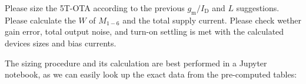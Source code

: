 \documentclass[
  a4paper,
  DIV=11,
  numbers=noendperiod]{scrartcl}
\begin{document}
\begin{tcolorbox}[enhanced jigsaw, breakable, title=\textcolor{quarto-callout-tip-color}{\faLightbulb}\hspace{0.5em}{Exercise: 5T-OTA Sizing}, left=2mm, bottomrule=.15mm, opacitybacktitle=0.6, opacityback=0, colframe=quarto-callout-tip-color-frame, leftrule=.75mm, bottomtitle=1mm, colbacktitle=quarto-callout-tip-color!10!white, toprule=.15mm, rightrule=.15mm, toptitle=1mm, titlerule=0mm, arc=.35mm, colback=white, coltitle=black]

Please size the 5T-OTA according to the previous
\(g_\mathrm{m}/I_\mathrm{D}\) and \(L\) suggestions. Please calculate
the \(W\) of \(M_{1-6}\) and the total supply current. Please check
wether gain error, total output noise, and turn-on settling is met with
the calculated devices sizes and bias currents.

\end{tcolorbox}

The sizing procedure and its calculation are best performed in a Jupyter
notebook, as we can easily look up the exact data from the pre-computed
tables:
\end{document}
